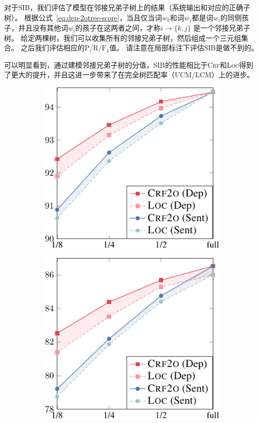 对于SIB，我们评估了模型在邻接兄弟子树上的结果（系统输出和对应的正确子树）。
根据公式~\ref{eq:dep-2otree-score}，当且仅当词$w_k$和词$w_j$都是词$w_i$的同侧孩子，并且没有其他词$w_i$的孩子在这两者之间，才称$i\rightarrow \{k,j\}$ 是一个邻接兄弟子树。
给定两棵树，我们可以收集所有的邻接兄弟子树，然后组成一个三元组集合。
之后我们评估相应的P/R/$\mathrm{F}_1$值。
请注意在局部标注下评估SIB是做不到的。

可以明显看到，通过建模邻接兄弟子树的分值，SIB的性能相比于\textsc{Crf}和\textsc{Loc}得到了更大的提升，并且这进一步带来了在完全树匹配率（UCM/LCM）上的进步。

\begin{figure}[tb!]
	\centering
	\begin{subfigure}[b]{0.4\textwidth}
		\centering
		\includegraphics[width=1.\textwidth]{figures/part-gap-ptb.pdf}
	\end{subfigure}
	\begin{subfigure}[b]{0.4\textwidth}
		\centering
		\includegraphics[width=1.\textwidth]{figures/part-gap-conll.pdf}

\end{subfigure}
\end{figure}
